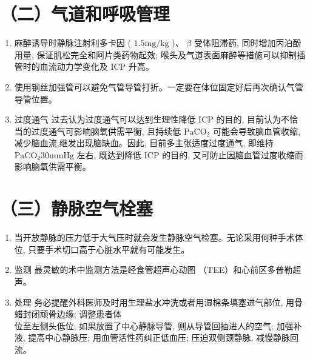 \documentclass[10pt]{article}
\begin{document}
\section*{（二）气道和呼吸管理}
\begin{enumerate}
  \item 麻醉诱导时静脉注射利多卡因 ( $1.5 \mathrm{mg} / \mathrm{kg}$ )、 $\beta$ 受体阻滞药, 同时增加丙泊酚用量, 保证肌松完全和阿片类药物起效; 喉头及气道表面麻醉等措施可以抑制插管时的血流动力学变化及 ICP 升高。

  \item 使用钢丝加强管可以避免气管导管打折。一定要在体位固定好后再次确认气管导管位置。

  \item 过度通气 过去认为过度通气可以达到生理性降低 ICP 的目的, 目前认为不恰当的过度通气可影响脑氧供需平衡, 且持续低 $\mathrm{PaCO}_{2}$ 可能会导致脑血管收缩, 减少脑血流,继发出现脑缺血。因此, 目前多主张适度过度通气, 即维持 $\mathrm{PaCO}_{2} 30 \mathrm{mmHg}$ 左右, 既达到降低 ICP 的目的, 又可防止因脑血管过度收缩而影响脑氧供需平衡。

\end{enumerate}

\section*{（三）静脉空气栓塞}
\begin{enumerate}
  \item 当开放静脉的压力低于大气压时就会发生静脉空气检塞。无论采用何种手术体位, 只要手术切口高于心脏水平就有可能发生。

  \item 监测 最灵敏的术中监测方法是经食管超声心动图 （TEE）和心前区多普勒超声。

  \item 处理 务必提醒外科医师及时用生理盐水冲洗或者用湿棉条填塞进气部位, 用骨蜡封闭顽骨边缘; 调整患者体\\
位至左侧头低位; 如果放置了中心静脉导管, 则从导管回抽进人的空气; 加强补液, 提高中心静脉压; 用血管活性药纠正低血压; 压迫双侧颈静脉, 减慢静脉回流。

\end{enumerate}
\end{document}
